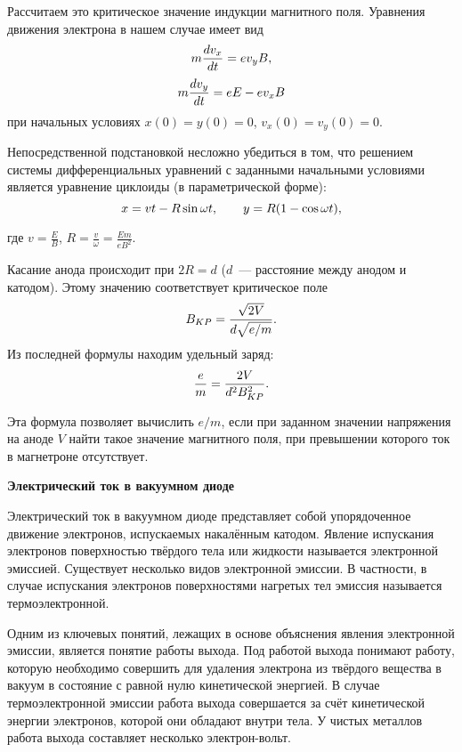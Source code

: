Рассчитаем это критическое значение индукции магнитного поля. Уравнения движения электрона в нашем случае имеет вид
\begin{equation}
	\eqmark{21g}
	m\frac{dv_x}{dt}=ev_y B,
\end{equation}
\begin{equation}
	\eqmark{22g}
	m\frac{dv_y}{dt}=eE-ev_x B
\end{equation}
при начальных условиях $x(0)=y(0)=0$, $v_x(0)=v_y(0)=0$.

Непосредственной подстановкой несложно убедиться в том, что решением системы дифференциальных уравнений с заданными
начальными условиями является уравнение циклоиды (в параметрической форме):
\begin{equation}
	\eqmark{23g}
	x = vt - R\sin\omega t,\qquad y = R(1-\cos\omega t),
\end{equation}

где $ v=\frac{E}{B}$, $R=\frac{v}{\omega}=\frac{Em}{eB^2}$.

Касание анода происходит при $2R=d$ ($d$~--- расстояние между анодом и катодом). Этому значению соответствует
критическое поле
\begin{equation}
	\eqmark{24g}
	B_{KP}=\frac{\sqrt{2V}}{d\sqrt{e/m}}.
\end{equation}
Из последней формулы находим удельный заряд:
\begin{equation}
	\eqmark{25g}
	\frac{e}{m}=\frac{2V}{d^2B_{KP}^2}.
\end{equation}

Эта формула позволяет вычислить $e/m$, если при заданном значении напряжения на аноде $V$ найти такое значение
магнитного поля, при превышении которого ток в магнетроне отсутствует.

{\bf \Large Электрический ток в вакуумном диоде}

Электрический ток в вакуумном диоде представляет собой упорядоченное движение электронов, испускаемых накалённым
катодом. Явление испускания электронов поверхностью твёрдого тела или жидкости называется {\textsf{электронной эмиссией}}.
Существует несколько видов электронной эмиссии. В частности, в случае испускания электронов поверхностями нагретых тел эмиссия называется {\textsf{термоэлектронной}}.

Одним из ключевых понятий, лежащих в основе объяснения явления электронной эмиссии, является понятие {\textsf{работы выхода}}. Под работой выхода понимают работу, которую необходимо совершить для удаления электрона из твёрдого вещества в вакуум в состояние с равной нулю кинетической энергией. В случае термоэлектронной эмиссии работа выхода совершается за счёт кинетической энергии электронов, которой они обладают внутри тела. У чистых металлов работа выхода составляет несколько электрон-вольт.

